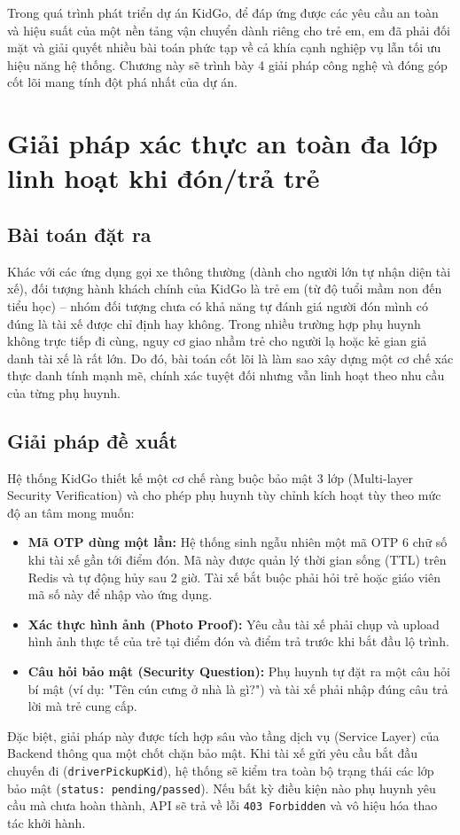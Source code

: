 \documentclass[../DoAn.tex]{subfiles}
\begin{document}
Trong quá trình phát triển dự án KidGo, để đáp ứng được các yêu cầu an toàn và hiệu suất của một nền tảng vận chuyển dành riêng cho trẻ em, em đã phải đối mặt và giải quyết nhiều bài toán phức tạp về cả khía cạnh nghiệp vụ lẫn tối ưu hiệu năng hệ thống. Chương này sẽ trình bày 4 giải pháp công nghệ và đóng góp cốt lõi mang tính đột phá nhất của dự án.

\section{Giải pháp xác thực an toàn đa lớp linh hoạt khi đón/trả trẻ}
\subsection{Bài toán đặt ra}
Khác với các ứng dụng gọi xe thông thường (dành cho người lớn tự nhận diện tài xế), đối tượng hành khách chính của KidGo là trẻ em (từ độ tuổi mầm non đến tiểu học) – nhóm đối tượng chưa có khả năng tự đánh giá người đón mình có đúng là tài xế được chỉ định hay không. Trong nhiều trường hợp phụ huynh không trực tiếp đi cùng, nguy cơ giao nhầm trẻ cho người lạ hoặc kẻ gian giả danh tài xế là rất lớn. Do đó, bài toán cốt lõi là làm sao xây dựng một cơ chế xác thực danh tính mạnh mẽ, chính xác tuyệt đối nhưng vẫn linh hoạt theo nhu cầu của từng phụ huynh.

\subsection{Giải pháp đề xuất}
Hệ thống KidGo thiết kế một cơ chế ràng buộc bảo mật 3 lớp (Multi-layer Security Verification) và cho phép phụ huynh tùy chỉnh kích hoạt tùy theo mức độ an tâm mong muốn:
\begin{itemize}
    \item \textbf{Mã OTP dùng một lần:} Hệ thống sinh ngẫu nhiên một mã OTP 6 chữ số khi tài xế gần tới điểm đón. Mã này được quản lý thời gian sống (TTL) trên Redis và tự động hủy sau 2 giờ. Tài xế bắt buộc phải hỏi trẻ hoặc giáo viên mã số này để nhập vào ứng dụng.
    \item \textbf{Xác thực hình ảnh (Photo Proof):} Yêu cầu tài xế phải chụp và upload hình ảnh thực tế của trẻ tại điểm đón và điểm trả trước khi bắt đầu lộ trình.
    \item \textbf{Câu hỏi bảo mật (Security Question):} Phụ huynh tự đặt ra một câu hỏi bí mật (ví dụ: "Tên cún cưng ở nhà là gì?") và tài xế phải nhập đúng câu trả lời mà trẻ cung cấp.
\end{itemize}
Đặc biệt, giải pháp này được tích hợp sâu vào tầng dịch vụ (Service Layer) của Backend thông qua một chốt chặn bảo mật. Khi tài xế gửi yêu cầu bắt đầu chuyến đi (\texttt{driverPickupKid}), hệ thống sẽ kiểm tra toàn bộ trạng thái các lớp bảo mật (\texttt{status: pending/passed}). Nếu bất kỳ điều kiện nào phụ huynh yêu cầu mà chưa hoàn thành, API sẽ trả về lỗi \texttt{403 Forbidden} và vô hiệu hóa thao tác khởi hành.
\end{document}
